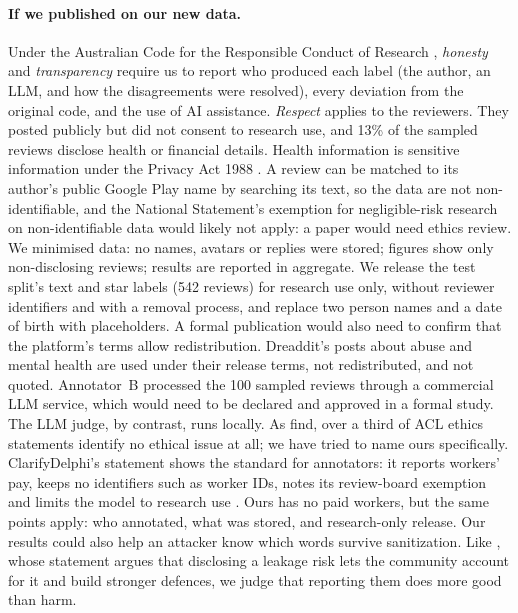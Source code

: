 \documentclass[11pt]{article}
\begin{document}
\paragraph{If we published on our new data.} Under the Australian Code for the Responsible Conduct of Research \citep{australiancode2018}, \emph{honesty} and \emph{transparency} require us to report who produced each label (the author, an LLM, and how the disagreements were resolved), every deviation from the original code, and the use of AI assistance. \emph{Respect} applies to the reviewers. They posted publicly but did not consent to research use, and 13\% of the sampled reviews disclose health or financial details. Health information is sensitive information under the Privacy Act 1988 \citep{privacyact1988}. A review can be matched to its author's public Google Play name by searching its text, so the data are not non-identifiable, and the National Statement's exemption for negligible-risk research on non-identifiable data \citep{nationalstatement2023} would likely not apply: a paper would need ethics review. We minimised data: no names, avatars or replies were stored; figures show only non-disclosing reviews; results are reported in aggregate. We release the test split's text and star labels (542 reviews) for research use only, without reviewer identifiers and with a removal process, and replace two person names and a date of birth with placeholders. A formal publication would also need to confirm that the platform's terms allow redistribution. Dreaddit's posts about abuse and mental health are used under their release terms, not redistributed, and not quoted. Annotator~B processed the 100 sampled reviews through a commercial LLM service, which would need to be declared and approved in a formal study. The LLM judge, by contrast, runs locally. As \citet{karamolegkou2025ethical} find, over a third of ACL ethics statements identify no ethical issue at all; we have tried to name ours specifically. ClarifyDelphi's statement shows the standard for annotators: it reports workers' pay, keeps no identifiers such as worker IDs, notes its review-board exemption and limits the model to research use \citep{pyatkin-etal-2023-clarifydelphi}. Ours has no paid workers, but the same points apply: who annotated, what was stored, and research-only release. Our results could also help an attacker know which words survive sanitization. Like \citet{li-etal-2024-seeing}, whose statement argues that disclosing a leakage risk lets the community account for it and build stronger defences, we judge that reporting them does more good than harm.
\end{document}
